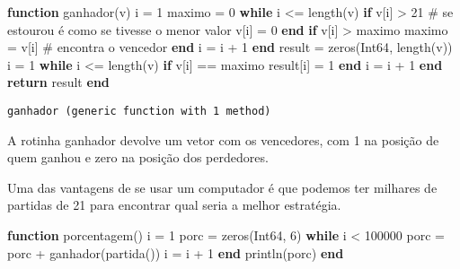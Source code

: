 \documentclass[
  letterpaper,
  DIV=11,
  numbers=noendperiod]{scrreprt}
\newenvironment{Shaded}{\begin{snugshade}}{\end{snugshade}}
\newcommand{\CommentTok}[1]{\textcolor[rgb]{0.37,0.37,0.37}{#1}}
\newcommand{\ControlFlowTok}[1]{\textcolor[rgb]{0.00,0.23,0.31}{\textbf{#1}}}
\newcommand{\DataTypeTok}[1]{\textcolor[rgb]{0.68,0.00,0.00}{#1}}
\newcommand{\FloatTok}[1]{\textcolor[rgb]{0.68,0.00,0.00}{#1}}
\newcommand{\FunctionTok}[1]{\textcolor[rgb]{0.28,0.35,0.67}{#1}}
\newcommand{\KeywordTok}[1]{\textcolor[rgb]{0.00,0.23,0.31}{\textbf{#1}}}
\newcommand{\NormalTok}[1]{\textcolor[rgb]{0.00,0.23,0.31}{#1}}
\newcommand{\OperatorTok}[1]{\textcolor[rgb]{0.37,0.37,0.37}{#1}}
\begin{document}
\begin{Shaded}
\begin{Highlighting}[]
\KeywordTok{function} \FunctionTok{ganhador}\NormalTok{(v)}
\NormalTok{    i }\OperatorTok{=} \FloatTok{1}
\NormalTok{    maximo }\OperatorTok{=} \FloatTok{0}
    \ControlFlowTok{while}\NormalTok{ i }\OperatorTok{\textless{}=} \FunctionTok{length}\NormalTok{(v)}
        \ControlFlowTok{if}\NormalTok{ v[i] }\OperatorTok{\textgreater{}} \FloatTok{21}  \CommentTok{\# se estourou é como se tivesse o menor valor}
\NormalTok{            v[i] }\OperatorTok{=} \FloatTok{0}
        \ControlFlowTok{end}
        \ControlFlowTok{if}\NormalTok{ v[i] }\OperatorTok{\textgreater{}}\NormalTok{ maximo}
\NormalTok{            maximo }\OperatorTok{=}\NormalTok{ v[i]  }\CommentTok{\# encontra o vencedor}
        \ControlFlowTok{end}
\NormalTok{        i }\OperatorTok{=}\NormalTok{ i }\OperatorTok{+} \FloatTok{1}
    \ControlFlowTok{end}
\NormalTok{    result }\OperatorTok{=} \FunctionTok{zeros}\NormalTok{(}\DataTypeTok{Int64}\NormalTok{, }\FunctionTok{length}\NormalTok{(v))}
\NormalTok{    i }\OperatorTok{=} \FloatTok{1}
        \ControlFlowTok{while}\NormalTok{ i }\OperatorTok{\textless{}=} \FunctionTok{length}\NormalTok{(v)}
            \ControlFlowTok{if}\NormalTok{ v[i] }\OperatorTok{==}\NormalTok{ maximo}
\NormalTok{                result[i] }\OperatorTok{=} \FloatTok{1}
            \ControlFlowTok{end}
\NormalTok{            i }\OperatorTok{=}\NormalTok{ i }\OperatorTok{+} \FloatTok{1}
        \ControlFlowTok{end}
    \ControlFlowTok{return}\NormalTok{ result}
\KeywordTok{end}
\end{Highlighting}
\end{Shaded}

\begin{verbatim}
ganhador (generic function with 1 method)
\end{verbatim}

A rotinha ganhador devolve um vetor com os vencedores, com 1 na posição
de quem ganhou e zero na posição dos perdedores.

Uma das vantagens de se usar um computador é que podemos ter milhares de
partidas de 21 para encontrar qual seria a melhor estratégia.

\begin{Shaded}
\begin{Highlighting}[]
\KeywordTok{function} \FunctionTok{porcentagem}\NormalTok{()}
\NormalTok{    i }\OperatorTok{=} \FloatTok{1}
\NormalTok{    porc }\OperatorTok{=} \FunctionTok{zeros}\NormalTok{(}\DataTypeTok{Int64}\NormalTok{, }\FloatTok{6}\NormalTok{)}
    \ControlFlowTok{while}\NormalTok{ i }\OperatorTok{\textless{}} \FloatTok{100000}
\NormalTok{        porc }\OperatorTok{=}\NormalTok{ porc }\OperatorTok{+} \FunctionTok{ganhador}\NormalTok{(}\FunctionTok{partida}\NormalTok{())}
\NormalTok{        i }\OperatorTok{=}\NormalTok{ i }\OperatorTok{+} \FloatTok{1}
    \ControlFlowTok{end}
    \FunctionTok{println}\NormalTok{(porc)}
\KeywordTok{end}
\end{Highlighting}
\end{Shaded}
\end{document}
